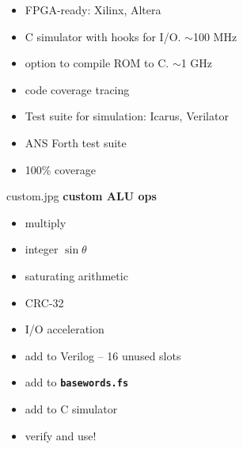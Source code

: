 \documentclass[compress,mathserif]{beamer}
\newcommand{\mach}[1]{\texttt{\textbf{#1}}}
\begin{document}
\begin{frame}
\begin{itemize}
   \item FPGA-ready: Xilinx, Altera
   \item C simulator with hooks for I/O. $\sim$100 MHz
   \item option to compile ROM to C. $\sim$1 GHz
   \item code coverage tracing
\end{itemize}
\end{frame}

\begin{frame}
\begin{itemize}
   \item Test suite for simulation: Icarus, Verilator
   \item ANS Forth test suite
   \item 100\% coverage
\end{itemize}
\end{frame}

\begin{imageframe}{custom.jpg}
  {\bf\LARGE custom ALU ops}
\end{imageframe}

\begin{frame}
\begin{itemize}
   \item multiply
   \item integer $\sin\theta$
   \item saturating arithmetic
   \item CRC-32
   \item I/O acceleration
\end{itemize}
\end{frame}

\begin{frame}
\begin{itemize}
   \item add to Verilog -- 16 unused slots
   \item add to \mach{basewords.fs}
   \item add to C simulator
   \item verify and use!
\end{itemize}
\end{frame}

\emptyslide
\end{document}
